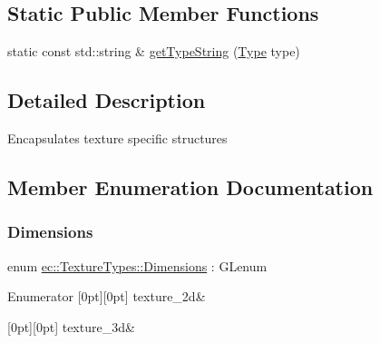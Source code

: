 \subsection*{Static Public Member Functions}
\begin{DoxyCompactItemize}
\item 
static const std\+::string \& \mbox{\hyperlink{structec_1_1_texture_types_aad3d1538e05d955cffc2c75feff20ea7}{get\+Type\+String}} (\mbox{\hyperlink{structec_1_1_texture_types_aff67825b98dd1edd7e4783350e866202}{Type}} type)
\end{DoxyCompactItemize}


\subsection{Detailed Description}
Encapsulates texture specific structures 

\subsection{Member Enumeration Documentation}
\mbox{\label{structec_1_1_texture_types_ac0e07f24452fa28dd8e6e33a224842fc}} 
\subsubsection{\texorpdfstring{Dimensions}{Dimensions}}
{\footnotesize\ttfamily enum \mbox{\hyperlink{structec_1_1_texture_types_ac0e07f24452fa28dd8e6e33a224842fc}{ec\+::\+Texture\+Types\+::\+Dimensions}} \+: G\+Lenum}

\begin{DoxyEnumFields}{Enumerator}
[0pt][0pt]{}\mbox{\label{structec_1_1_texture_types_ac0e07f24452fa28dd8e6e33a224842fca13a163219b727876c389ffc248f28e04}} 
texture\+\_\+2d&\\
\hline

[0pt][0pt]{}\mbox{\label{structec_1_1_texture_types_ac0e07f24452fa28dd8e6e33a224842fcaf7383d5e217f8da43906166138a147ab}} 
texture\+\_\+3d&\\
\hline

\end{DoxyEnumFields}
\mbox{\label{structec_1_1_texture_types_aff67825b98dd1edd7e4783350e866202}} 

